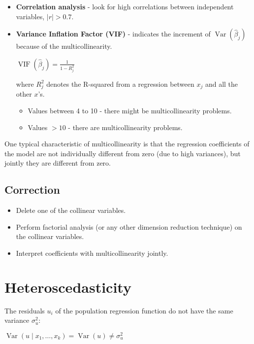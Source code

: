 \documentclass[10pt, a4paper, landscape]{article}
\DeclareMathOperator{\Var}{Var}
\begin{document}
\begin{multicols}{3}
\begin{itemize}[leftmargin=*]
	\item \textbf{Correlation analysis} - look for high correlations between independent variables, \( \lvert r \rvert > 0.7 \).
	\item \textbf{Variance Inflation Factor (VIF)} - indicates the increment of \( \Var(\hat{\beta}_{j}) \) because of the multicollinearity.
	\begin{center}
		\( \operatorname{VIF}(\hat{\beta}_{j}) = \frac{1}{1 - R_{j}^{2}} \)
	\end{center}
	where \( R_{j}^{2} \) denotes the R-squared from a regression between \( x_{j} \) and all the other \( x \)'s.
	\begin{itemize}[leftmargin=*]
		\item Values between 4 to 10 - there might be multicollinearity problems.
		\item Values \( > 10 \) - there are multicollinearity problems.
	\end{itemize}
\end{itemize}

One typical characteristic of multicollinearity is that the regression coefficients of the model are not individually different from zero (due to high variances), but jointly they are different from zero.

\subsection*{Correction}

\begin{itemize}[leftmargin=*]
	\item Delete one of the collinear variables.
	\item Perform factorial analysis (or any other dimension reduction technique) on the collinear variables.
	\item Interpret coefficients with multicollinearity jointly.
\end{itemize}

\columnbreak

\section*{Heteroscedasticity}

The residuals \( u_{i} \) of the population regression function do not have the same variance \( \sigma_{u}^{2} \):

\begin{center}
	\( \Var(u \mid x_{1}, \ldots, x_{k}) = \Var(u) \neq \sigma_{u}^{2} \)
\end{center}


\end{multicols}
\end{document}
